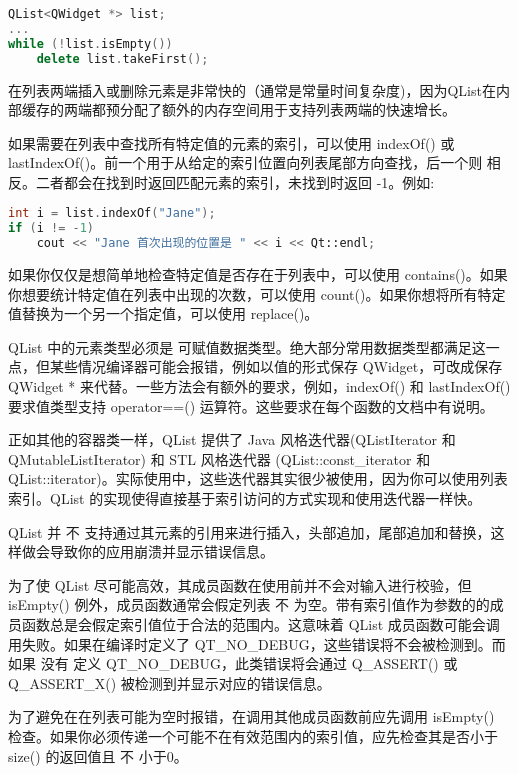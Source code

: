 \begin{lstlisting}[language=C++]
QList<QWidget *> list;
...
while (!list.isEmpty())
    delete list.takeFirst();
\end{lstlisting}

在列表两端插入或删除元素是非常快的（通常是常量时间复杂度)，因为QList在内部缓存的两端都预分配了额外的内存空间用于支持列表两端的快速增长。

如果需要在列表中查找所有特定值的元素的索引，可以使用 indexOf() 或
lastIndexOf()。前一个用于从给定的索引位置向列表尾部方向查找，后一个则
相反。二者都会在找到时返回匹配元素的索引，未找到时返回 -1。例如:


\begin{lstlisting}[language=C++]
int i = list.indexOf("Jane");
if (i != -1)
    cout << "Jane 首次出现的位置是 " << i << Qt::endl;
\end{lstlisting}

如果你仅仅是想简单地检查特定值是否存在于列表中，可以使用 contains()。如果你想要统计特定值在列表中出现的次数，可以使用 count()。如果你想将所有特定值替换为一个另一个指定值，可以使用 replace()。

QList 中的元素类型必须是 可赋值数据类型。绝大部分常用数据类型都满足这一点，但某些情况编译器可能会报错，例如以值的形式保存 QWidget，可改成保存 QWidget * 来代替。一些方法会有额外的要求，例如，indexOf() 和 lastIndexOf() 要求值类型支持 operator==() 运算符。这些要求在每个函数的文档中有说明。

正如其他的容器类一样，QList 提供了 Java 风格迭代器(QListIterator 和 QMutableListIterator) 和 STL 风格迭代器 (QList::const\_iterator 和 QList::iterator)。实际使用中，这些迭代器其实很少被使用，因为你可以使用列表索引。QList 的实现使得直接基于索引访问的方式实现和使用迭代器一样快。

QList 并 不 支持通过其元素的引用来进行插入，头部追加，尾部追加和替换，这样做会导致你的应用崩溃并显示错误信息。

为了使 QList 尽可能高效，其成员函数在使用前并不会对输入进行校验，但 isEmpty() 例外，成员函数通常会假定列表 不 为空。带有索引值作为参数的的成员函数总是会假定索引值位于合法的范围内。这意味着 QList 成员函数可能会调用失败。如果在编译时定义了 QT\_NO\_DEBUG，这些错误将不会被检测到。而如果 没有 定义 QT\_NO\_DEBUG，此类错误将会通过 Q\_ASSERT() 或 Q\_ASSERT\_X() 被检测到并显示对应的错误信息。

为了避免在在列表可能为空时报错，在调用其他成员函数前应先调用 isEmpty()
检查。如果你必须传递一个可能不在有效范围内的索引值，应先检查其是否小于
size() 的返回值且 不 小于0。

